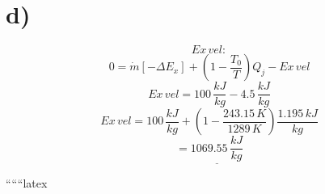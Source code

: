 

\section*{d)}
\[
Ex \, vel:
\]
\[
0 = \dot{m} \left[ -\Delta E_x \right] + \left( 1 - \frac{T_0}{T} \right) Q_j - Ex \, vel
\]
\[
Ex \, vel = 100 \, \frac{kJ}{kg} - 4.5 \, \frac{kJ}{kg}
\]
\[
Ex \, vel = 100 \, \frac{kJ}{kg} + \left( 1 - \frac{243.15 \, K}{1289 \, K} \right) \frac{1.195 \, kJ}{kg}
\]
\[
= \underline{1069.55 \, \frac{kJ}{kg}}
\]

``````latex